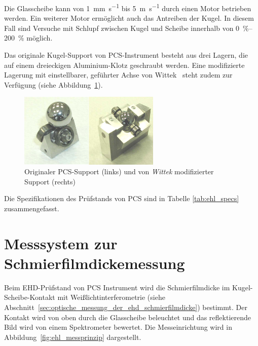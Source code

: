 Die Glasscheibe kann von \SI[per-mode=symbol]{1}{\milli\meter\per\second} bis \SI[per-mode=symbol]{5}{\meter\per\second} durch einen Motor betrieben werden.
Ein weiterer Motor ermöglicht auch das Antreiben der Kugel.
In diesem Fall sind Versuche mit Schlupf zwischen Kugel und Scheibe innerhalb von \SIrange{0}{200}{\percent} möglich.

Das originale Kugel-Support von PCS-Instrument besteht aus drei Lagern, die auf einem dreieckigen Aluminium-Klotz geschraubt werden.
Eine modifizierte Lagerung mit einstellbarer, geführter Achse von Wittek~\cite{wittek_2007} steht zudem zur Verfügung (siehe Abbildung~\ref{fig:kugel_support}).

\begin{figure}[htb]
    \centering
    \includegraphics[width=0.6\textwidth]{./images/kugel-support_original_und_wittek.jpg}
    \caption{Originaler PCS-Support (links) und von \textit{Wittek} modifizierter Support (rechts)~\cite{wittek_2007}}
    \label{fig:kugel_support}
\end{figure}

Die Spezifikationen des Prüfstands von PCS sind in Tabelle \ref{tab:ehl_specs} zusammengefasst.

\section{Messsystem zur Schmierfilmdickemessung}
\label{sec:messsystem_zur_schmierfilmdickemessung}

Beim EHD-Prüfstand von PCS Instrument wird die Schmierfilmdicke im Kugel-Scheibe-Kontakt mit Weißlichtinterferometrie (siehe Abschnitt~\ref{sec:optische_messung_der_ehd_schmierfilmdicke}) bestimmt.
Der Kontakt wird von oben durch die Glasscheibe beleuchtet und das reflektierende Bild wird von einem Spektrometer bewertet.
Die Messeinrichtung wird in Abbildung~\ref{fig:ehl_messprinzip} dargestellt.

